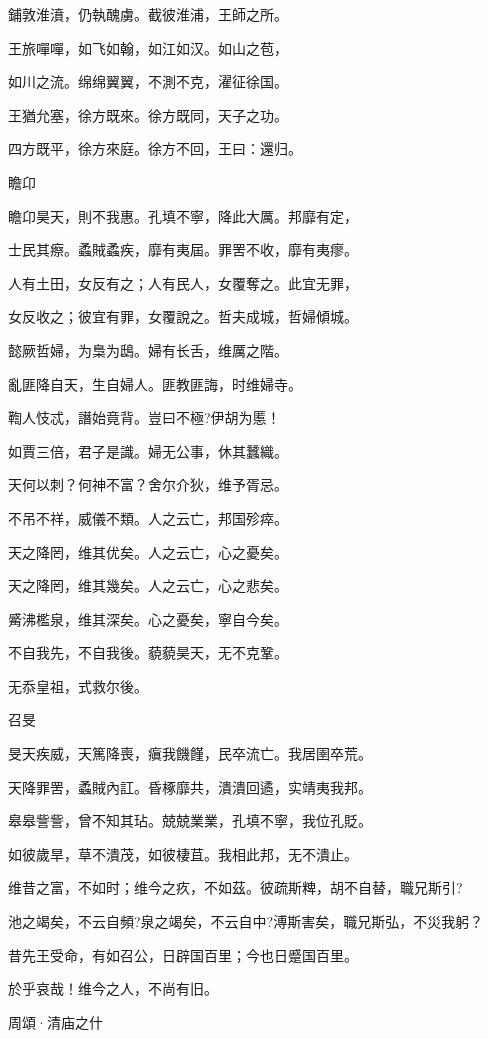 鋪敦淮濆，仍執醜虜。截彼淮浦，王師之所。

王旅嘽嘽，如飞如翰，如江如汉。如山之苞，

如川之流。绵绵翼翼，不測不克，濯征徐国。

王猶允塞，徐方既來。徐方既同，天子之功。

四方既平，徐方來庭。徐方不回，王曰：還归。

瞻卬

瞻卬昊天，則不我惠。孔填不寧，降此大厲。邦靡有定，

士民其瘵。蟊賊蟊疾，靡有夷屆。罪罟不收，靡有夷瘳。

人有土田，女反有之；人有民人，女覆奪之。此宜无罪，

女反收之；彼宜有罪，女覆說之。哲夫成城，哲婦傾城。

懿厥哲婦，为梟为鴟。婦有长舌，维厲之階。

亂匪降自天，生自婦人。匪教匪誨，时维婦寺。

鞫人忮忒，譖始竟背。豈曰不極?伊胡为慝！

如賈三倍，君子是識。婦无公事，休其蠶織。

天何以刺？何神不富？舍尔介狄，维予胥忌。

不吊不祥，威儀不類。人之云亡，邦国殄瘁。

天之降罔，维其优矣。人之云亡，心之憂矣。

天之降罔，维其幾矣。人之云亡，心之悲矣。

觱沸檻泉，维其深矣。心之憂矣，寧自今矣。

不自我先，不自我後。藐藐昊天，无不克鞏。

无忝皇祖，式救尔後。

召旻

旻天疾威，天篤降喪，瘨我饑饉，民卒流亡。我居圉卒荒。

天降罪罟，蟊賊內訌。昏椓靡共，潰潰回遹，实靖夷我邦。

皋皋訾訾，曾不知其玷。兢兢業業，孔填不寧，我位孔貶。

如彼歲旱，草不潰茂，如彼棲苴。我相此邦，无不潰止。

维昔之富，不如时；维今之疚，不如茲。彼疏斯粺，胡不自替，職兄斯引?

池之竭矣，不云自頻?泉之竭矣，不云自中?溥斯害矣，職兄斯弘，不災我躬？

昔先王受命，有如召公，日辟国百里；今也日蹙国百里。

於乎哀哉！维今之人，不尚有旧。




周頌·清庙之什

